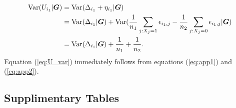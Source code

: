 \begin{appendices}
\begin{equation}
	\begin{aligned}
		\text{Var}(U_{i_1}|\bm G) &= \text{Var}(\Delta_{i_1} + \eta_{i_1} |\bm G) \\
		& = \text{Var}(\Delta_{i_1}|\bm G) + \text{Var}(\dfrac{1}{n_1}\sum_{j: X_j=1}\epsilon_{i_1,j}-
		\dfrac{1}{n_2}\sum_{j: X_j=0}\epsilon_{i_1,j}|\bm G)\\
		& =\text{Var}(\Delta_{i_1}|\bm G) + \frac{1}{n_1} + \frac{1}{n_2}. 
	\end{aligned}
	\end{equation}
	Equation (\ref{eq:U_var}) immediately follows from equations (\ref{eq:app1}) and 
	(\ref{eq:app2}).	
	
	
	
	\subsection{Supplimentary Tables}\label{app:supp}
		\begin{table}[H]
			\centering
			\caption[Summary information for the 24 experiments used in Chapter 
			\ref{chap1}]{Summary of data sets used in the three groups: the seedling, the leaf and 
			the 
				multi-tissue groups.} 
			\label{app:24experiments}
\end{table}
\end{appendices}

